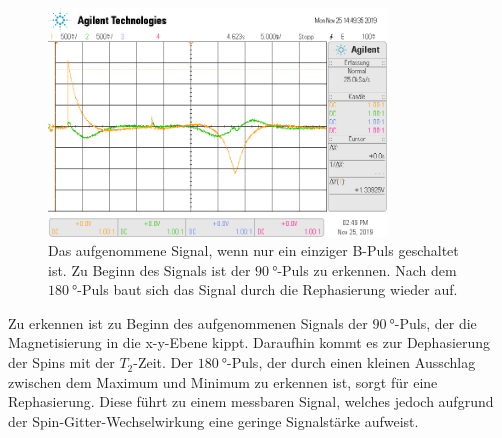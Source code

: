 \begin{figure}[H]
  \centering
  \includegraphics[width=0.8\textwidth]{../data/scope_77.png}
  \caption{Das aufgenommene Signal, wenn nur ein einziger B-Puls geschaltet ist. Zu Beginn des Signals ist der 
  $\SI{90}{\degree}$-Puls zu erkennen. Nach dem $\SI{180}{\degree}$-Puls baut sich das Signal durch die Rephasierung 
  wieder auf.}
  \label{fig:N1}
\end{figure} \noindent
Zu erkennen ist zu Beginn des aufgenommenen Signals der $\SI{90}{\degree}$-Puls, der die Magnetisierung in die x-y-Ebene kippt.
Daraufhin kommt es zur Dephasierung der Spins mit der $T_2$-Zeit. Der $\SI{180}{\degree}$-Puls, der durch einen kleinen Ausschlag
zwischen dem Maximum und Minimum zu erkennen ist, sorgt für eine Rephasierung. Diese führt zu einem messbaren Signal, welches 
jedoch aufgrund der Spin-Gitter-Wechselwirkung eine geringe Signalstärke aufweist.

